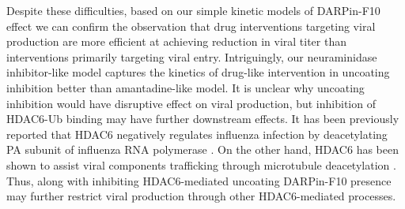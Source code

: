 Despite these difficulties, based on our simple kinetic models of DARPin-F10 effect we can confirm the observation \cite{heldt2013multiscale} that drug interventions targeting viral production are more efficient at achieving reduction in viral titer than interventions primarily targeting viral entry. Intriguingly, our neuraminidase inhibitor-like model captures the kinetics of drug-like intervention in uncoating inhibition better than amantadine-like model. It is unclear why uncoating inhibition would have disruptive effect on viral production, but inhibition of HDAC6-Ub binding may have further downstream effects. It has been previously reported that HDAC6 negatively regulates influenza infection by deacetylating PA subunit of influenza RNA polymerase \cite{chen2019hdac6}. On the other hand, HDAC6 has been shown to assist viral components trafficking through microtubule deacetylation \cite{husain2014histone}. Thus, along with inhibiting HDAC6-mediated uncoating DARPin-F10 presence may further restrict viral production through other HDAC6-mediated processes.